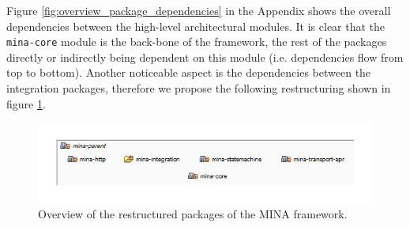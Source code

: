 Figure \ref{fig:overview_package_dependencies} in the Appendix shows the overall dependencies between the high-level architectural modules. It is clear that the \texttt{mina-core} module is the back-bone of the framework, the rest of the packages directly or indirectly being dependent on this module (i.e. dependencies flow from top to bottom). Another noticeable aspect is the dependencies between the integration packages, therefore we propose the following restructuring shown in figure \ref{fig:packages_restructure}.

\begin{figure}[H]
    \centering
    \includegraphics[width=\textwidth]{images/MINA_overview_restructured.png}
    \caption{Overview of the restructured packages of the MINA framework.}
    \label{fig:packages_restructure}
\end{figure}

